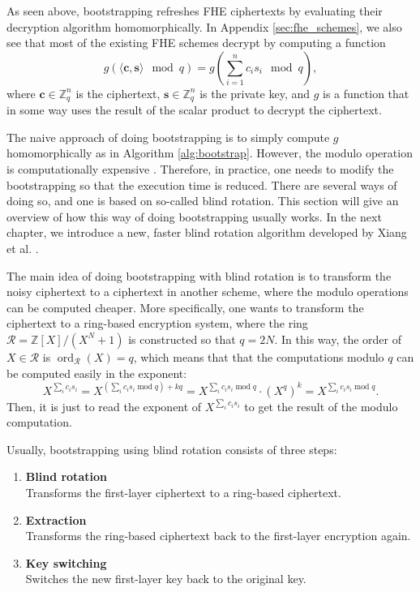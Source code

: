 As seen above, bootstrapping refreshes FHE ciphertexts by evaluating their decryption algorithm homomorphically. In Appendix \ref{sec:fhe_schemes}, we also see that most of the existing FHE schemes decrypt by computing a function $$g(\langle \mathbf{c}, \mathbf{s} \rangle  \mod q) = g(\sum_{i=1}^nc_is_i \mod q ),$$ where $\mathbf{c} \in \mathbb{Z}_q^n$ is the ciphertext, $\mathbf{s} \in \mathbb{Z}_q^n$ is the private key, and $g$ is a function that in some way uses the result of the scalar product to decrypt the ciphertext.

The naive approach of doing bootstrapping is to simply compute $g$ homomorphically as in Algorithm \ref{alg:bootstrap}. However, the modulo operation is computationally expensive \cite{cite:fast_bootstrap_crypto23}. Therefore, in practice, one needs to modify the bootstrapping so that the execution time is reduced. There are several ways of doing so, and one is based on so-called blind rotation. This section will give an overview of how this way of doing bootstrapping usually works. In the next chapter, we introduce a new, faster blind rotation algorithm developed by Xiang et al. \cite{cite:fast_bootstrap_crypto23}.

The main idea of doing bootstrapping with blind rotation is to transform the noisy ciphertext to a ciphertext in another scheme, where the modulo operations can be computed cheaper. More specifically, one wants to transform the ciphertext to a ring-based encryption system, where the ring $\mathcal{R} = \mathbb{Z}[X]/(X^N+1)$ is constructed so that $q=2N$. In this way, the order of $X \in \mathcal{R}$ is $\operatorname{ord}_{\mathcal{R}} (X) =  q$, which means that that the computations modulo $q$ can be computed easily in the exponent:
$$X^{ \sum_i c_i s_i  } =
X ^ {(\sum_i c_i s_i \operatorname{mod} q) + kq} =
X^{\sum_i c_i s_i \operatorname{mod} q} \cdot (X^q)^k =
X^{\sum_i c_i s_i \operatorname{mod} q}.$$
Then, it is just to read the exponent of $X^{ \sum_i c_i s_i  }$ to get the result of the modulo computation. 

Usually, bootstrapping using blind rotation consists of three steps:
\begin{enumerate}[font=\bfseries]
    \item \textbf{Blind rotation} \\ Transforms the first-layer ciphertext to a ring-based ciphertext. 
    \item \textbf{Extraction} \\ Transforms the ring-based ciphertext back to the first-layer encryption again.
    \item \textbf{Key switching} \\ Switches the new first-layer key back to the original key.
\end{enumerate}

